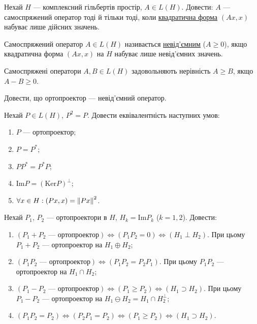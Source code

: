 \begin{exercise}
    Нехай $H$ --- комплексний гільбертів простір, $A \in L(H)$. Довести: 
    $A$ --- самоспряжений оператор тоді й тільки тоді, коли 
    \uline{квадратична форма} $(Ax, x)$ набуває лише дійсних значень.
\end{exercise}

\begin{theory}
    Самоспряжений оператор $A \in L(H)$ називається \uline{невід'ємним} ($A \geq 0$),
    якщо квадратична форма $(Ax, x)$ на $H$ набуває лише невід'ємних значень.

    Самоспряжені оператори $A, B \in L(H)$ задовольняють нерівність $A \geq B$, якщо $A - B \geq 0$.
\end{theory}

\begin{exercise}
    Довести, що ортопроектор --- невід'ємний оператор.
\end{exercise}

\begin{exercise}
    Нехай $P \in L(H)$, $P^2 = P$. Довести еквівалентність наступних умов:
    \begin{enumerate}[label=\ukr*)]
        \item $P$ --- ортопроектор;
        \item $P = P^*$;
        \item $P P^* = P^* P$;
        \item $\mathrm{Im} P = (\mathrm{Ker} P)^\perp$;
        \item $\forall x \in H: (Px, x) = \left\lVert Px\right\rVert^2$.
    \end{enumerate}
\end{exercise}

\begin{exercise}\label{N:1_3_18}
    Нехай $P_1$, $P_2$ --- ортопроектори в $H$, $H_k = \mathrm{Im} P_k$ ($k = 1, 2$).
    Довести:
    \begin{enumerate}[label=\ukr*)]
        \item\label{N:1_3_18_a} $(P_1 + P_2 \text{ --- ортопроектор}) \Leftrightarrow (P_1 P_2 = 0) \Leftrightarrow (H_1 \perp H_2)$.
        При цьому $P_1 + P_2$ --- ортопроектор на $H_1 \oplus H_2$;
        \item $(P_1 P_2 \text{ --- ортопроектор}) \Leftrightarrow (P_1 P_2 = P_2 P_1)$.
        При цьому $P_1 P_2$ --- ортопроектор на $H_1 \cap H_2$;
        \item $(P_1 - P_2 \text{ --- ортопроектор}) \Leftrightarrow (P_1 \geq P_2) \Leftrightarrow (H_1 \supset H_2)$.
        При цьому $P_1 - P_2$ --- ортопроектор на $H_1 \ominus H_2 = H_1 \cap H_2^\perp$;
        \item $(P_1 P_2 = P_2) \Leftrightarrow (P_2 P_1 = P_2) \Leftrightarrow (P_1 \geq P_2) \Leftrightarrow (H_1 \supset H_2)$.
    \end{enumerate}
\end{exercise}

